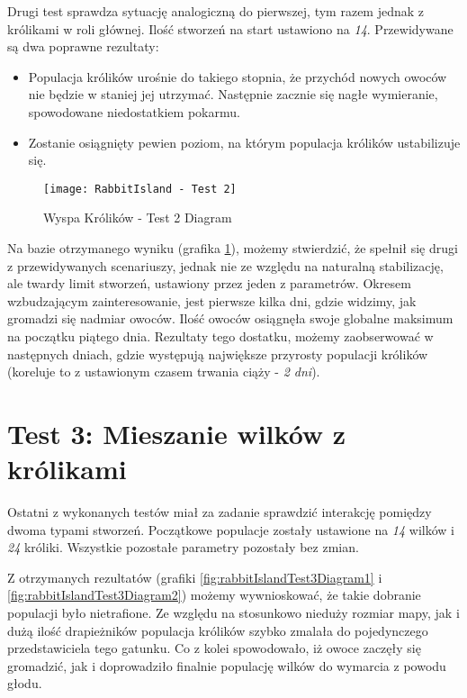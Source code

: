 \par Drugi test sprawdza sytuację analogiczną do pierwszej, tym razem jednak z królikami w roli głównej. Ilość stworzeń na start ustawiono na \emph{14}. Przewidywane są dwa poprawne rezultaty:
\begin{itemize}
	\item Populacja królików urośnie do takiego stopnia, że przychód nowych owoców nie będzie w staniej jej utrzymać. Następnie zacznie się nagłe wymieranie, spowodowane niedostatkiem pokarmu.
	\item Zostanie osiągnięty pewien poziom, na którym populacja królików ustabilizuje się.
\end{itemize}

\begin{figure}
	\texttt{[image: RabbitIsland - Test 2]}
	\caption{Wyspa Królików - Test 2 Diagram}
	\label{fig:rabbitIslandTest2Diagram1}
\end{figure}

\par Na bazie otrzymanego wyniku (grafika \ref{fig:rabbitIslandTest2Diagram1}), możemy stwierdzić, że spełnił się drugi z przewidywanych scenariuszy, jednak nie ze względu na naturalną stabilizację, ale twardy limit stworzeń, ustawiony przez jeden z parametrów. Okresem wzbudzającym zainteresowanie, jest pierwsze kilka dni, gdzie widzimy, jak gromadzi się nadmiar owoców. Ilość owoców osiągnęła swoje globalne maksimum na początku piątego dnia. Rezultaty tego dostatku, możemy zaobserwować w następnych dniach, gdzie występują największe przyrosty populacji królików (koreluje to z ustawionym czasem trwania ciąży - \emph{2 dni}).

\section{Test 3: Mieszanie wilków z królikami}

\par Ostatni z wykonanych testów miał za zadanie sprawdzić interakcję pomiędzy dwoma typami stworzeń. Początkowe populacje zostały ustawione na \emph{14} wilków i \emph{24} króliki. Wszystkie pozostałe parametry pozostały bez zmian.

\par Z otrzymanych rezultatów (grafiki \ref{fig:rabbitIslandTest3Diagram1} i \ref{fig:rabbitIslandTest3Diagram2}) możemy wywnioskować, że takie dobranie populacji było nietrafione. Ze względu na stosunkowo nieduży rozmiar mapy, jak i dużą ilość drapieżników populacja królików szybko zmalała do pojedynczego przedstawiciela tego gatunku. Co z kolei spowodowało, iż owoce zaczęły się gromadzić, jak i doprowadziło finalnie populację wilków do wymarcia z powodu głodu.

